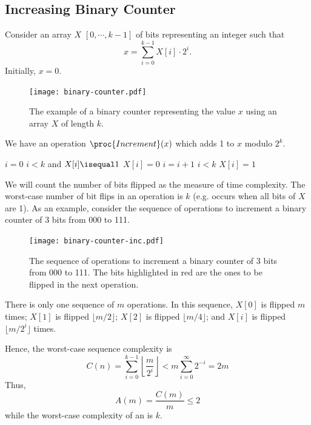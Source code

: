 \subsection{Increasing Binary Counter}

Consider an array $X$ $[0,\cdots,k-1]$ of bits representing an integer such that
$$
x = \sum_{i=0}^{k-1} X[i]\cdot 2^i.
$$
Initially, $x=0$.

\begin{figure}[htbp]
    \centering
    \texttt{[image: binary-counter.pdf]}
    \caption{The example of a binary counter representing the value $x$ using an array $X$ of length $k$.}
    \label{fig:binary-counter}
\end{figure}

We have an operation $\proc{Increment}(x)$ which adds 1 to $x$ modulo $2^k$.

\begin{codebox}
    \li $i = 0$ 
    \li \While $i<k$ and $X[i] \isequal 1$ \Do
        \li $X[i] = 0$ 
        \li $i = i + 1$ \End
    \li \If $i < k$ \Then
        \li $X[i] = 1$ 
    \End
\end{codebox}

We will count the number of bits flipped as the measure of time complexity. The worst-case number of bit flips in an  operation is $k$ (e.g. occurs when all bits of $X$ are 1). As an example, consider the sequence of operations to increment a binary counter of 3 bits from 000 to 111.

\begin{figure}[htbp]
    \centering
    \texttt{[image: binary-counter-inc.pdf]}
    \caption{The sequence of operations to increment a binary counter of 3 bits from 000 to 111. The bits highlighted in red are the ones to be flipped in the next  operation.}
    \label{fig:binary-counter-inc}
\end{figure}

There is only one sequence of $m$  operations. In this sequence, $X[0]$ is flipped $m$ times; $X[1]$ is flipped $\lfloor m/2 \rfloor$; $X[2]$ is flipped $\lfloor m/4 \rfloor$; and $X[i]$ is flipped $\lfloor m/2^i \rfloor$ times.

Hence, the worst-case sequence complexity is
$$
C(n) = \sum_{i=0}^{k-1} \left\lfloor \frac{m}{2^i} \right\rfloor < m \sum_{i=0}^\infty 2^{-i} = 2m
$$
Thus,
$$
A(m) = \frac{C(m)}{m} \leq 2
$$
while the worst-case complexity of an  is $k$.

